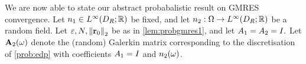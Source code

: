 
\ere

We are now able to state our abstract probabalistic result on GMRES convergence.
\label{thm:probgmres}
Let $\no \in \LiDRRR$ be fixed, and let $\nt:\Omega\rightarrow\LiDRRR$ be a random field. Let $\eps, \dofs, \Nt{\brz}$ be as in \cref{lem:probgmres1}, and let $A_{1} = A_{2} = I.$ Let $\mathbf{A}_{2}(\omega)$ denote the (random) Galerkin matrix corresponding to the discretisation of \cref{prob:edp} with coefficients $A_{1}=I$ and $n_{2}(\omega)$.

